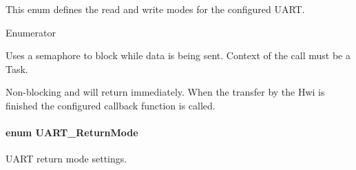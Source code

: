 This enum defines the read and write modes for the configured U\+A\+R\+T. \begin{Desc}
\item[Enumerator]\par
\begin{description}
\item[{\em 
U\+A\+R\+T\+\_\+\+M\+O\+D\+E\+\_\+\+B\+L\+O\+C\+K\+I\+N\+G\label{_u_a_r_t_8h_a2507a620dba95cd20885c52494d19e90ae6b6bd5d2d5df859ad6724e89e605ebf}
}]Uses a semaphore to block while data is being sent. Context of the call must be a Task. \item[{\em 
U\+A\+R\+T\+\_\+\+M\+O\+D\+E\+\_\+\+C\+A\+L\+L\+B\+A\+C\+K\label{_u_a_r_t_8h_a2507a620dba95cd20885c52494d19e90ae0dbd9b5195e56c3c2aed10163523754}
}]Non-\/blocking and will return immediately. When the transfer by the Hwi is finished the configured callback function is called. \end{description}
\end{Desc}
\paragraph[{U\+A\+R\+T\+\_\+\+Return\+Mode}]{\setlength{\rightskip}{0pt plus 5cm}enum {\bf U\+A\+R\+T\+\_\+\+Return\+Mode}}\label{_u_a_r_t_8h_acb5a82843435a1b5d51b6c27028d914f}


U\+A\+R\+T return mode settings. 

